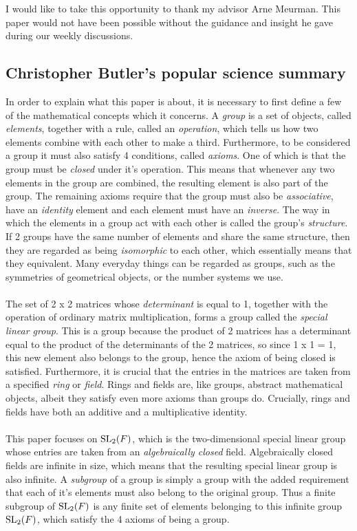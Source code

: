 I would like to take this opportunity to thank my advisor Arne Meurman. This paper would not have been possible without the guidance and insight he gave during our weekly discussions.


\subsection{Christopher Butler's popular science summary}

In order to explain what this paper is about, it is necessary to first define a few of the mathematical concepts which it concerns. A \textit{group} is a set of objects, called \textit{elements}, together with a rule, called an \textit{operation}, which tells us how two elements combine with each other to make a third. Furthermore, to be considered a group it must also satisfy 4 conditions, called \textit{axioms}. One of which is that the group must be \textit{closed} under it's operation. This means that whenever any two elements in the group are combined, the resulting element is also part of the group. The remaining axioms require that the group must also be \textit{associative}, have an \textit{identity} element and each element must have an \textit{inverse}. The way in which the elements in a group act with each other is called the group's \textit{structure}. If 2 groups have the same number of elements and share the same structure, then they are regarded as being \textit{isomorphic} to each other, which essentially means that they equivalent. Many everyday things can be regarded as groups, such as the symmetries of geometrical objects, or the number systems we use. \\
\\
The set of 2 x 2 matrices whose \textit{determinant} is equal to 1, together with the operation of ordinary matrix multiplication, 
forms a group called the \textit{special linear group}. This is a group because the product of 2 matrices has a determinant equal to the product of the determinants of the 2 matrices, 
so since 1 x 1 = 1, this new element also belongs to the group, hence the axiom of being closed is satisfied. 
Furthermore, it is crucial that the entries in the matrices are taken from a specified \textit{ring} or \textit{field}. 
Rings and fields are, like groups, abstract mathematical objects, albeit they satisfy even more axioms than groups do. Crucially, rings and fields have both an additive and a multiplicative identity. \\
\\
This paper focuses on $\operatorname{SL}_2(F)$, which is the two-dimensional special linear group whose entries are taken from an \textit{algebraically closed} field. Algebraically closed fields are infinite in size, which means that the resulting special linear group is also infinite. A \textit{subgroup} of a group is simply a group with the added requirement that each of it's elements must also belong to the original group. Thus a finite subgroup of $\operatorname{SL}_2(F)$ is any finite set of elements belonging to this infinite group $\operatorname{SL}_2(F)$, which satisfy the 4 axioms of being a group. \\
